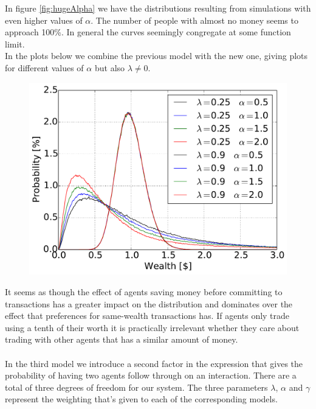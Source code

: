 In figure \ref{fig:hugeAlpha} we have the distributions resulting from simulations with even higher values of $\alpha$. The number of people with almost no money seems to approach 100\%. In general the curves seemingly congregate at some function limit.\\


In the plots below we combine the previous model with the new one, giving plots for different values of $\alpha$ but also $\lambda \neq 0$.
\begin{figure}[H]
    \centering
    \includegraphics[width = 0.7\linewidth]{result/bilder/5d-2590}
    \caption{}
    \label{fig:5d}
\end{figure}
It seems as though the effect of agents saving money before committing to transactions has a greater impact on the distribution and dominates over the effect that preferences for same-wealth transactions has. If agents only trade using a tenth of their worth it is practically irrelevant whether they care about trading with other agents that has  a similar amount of money.\\\\

In the third model we introduce a second factor in the expression that gives the probability of having two agents follow through on an interaction. There are a total of three degrees of freedom for our system. The three parameters $\lambda$, $\alpha$ and $\gamma$ represent the weighting that's given to each of the corresponding models.

